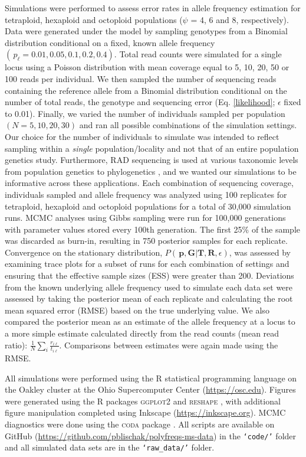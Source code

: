 \documentclass[11pt,english,letterpaper,oneside]{article}
\begin{document}
Simulations were performed to assess error rates in allele frequency estimation for tetraploid, hexaploid and octoploid populations ($\psi$ = 4, 6 and 8, respectively). Data were generated under the model by sampling genotypes from a Binomial distribution conditional on a fixed, known allele frequency $(\,p_{\ell} = 0.01, 0.05, 0.1, 0.2, 0.4)$. Total read counts were simulated for a single locus using a Poisson distribution with mean coverage equal to 5, 10, 20, 50 or 100 reads per individual. We then sampled the number of sequencing reads containing the reference allele from a Binomial distribution conditional on the number of total reads, the genotype and sequencing error (Eq. \ref{likelihood}; $\epsilon$ fixed to 0.01). Finally, we varied the number of individuals sampled per population $(N = 5, 10, 20, 30)$ and ran all possible combinations of the simulation settings. Our choice for the number of individuals to simulate was intended to reflect sampling within a \textit{single} population/locality and not that of an entire population genetics study. Furthermore, RAD sequencing is used at various taxonomic levels from population genetics to phylogenetics \citep[e.g.,][]{rheindt2013zimmerius,eaton2015oaks}, and we wanted our simulations to be informative across these applications. Each combination of sequencing coverage, individuals sampled and allele frequency was analyzed using 100 replicates for tetraploid, hexaploid and octoploid populations for a total of  30,000 simulation runs. MCMC analyses using Gibbs sampling were run for 100,000 generations with parameter values stored every 100th generation. The first 25\% of the sample was discarded as burn-in, resulting in 750 posterior samples for each replicate. Convergence on the stationary distribution, $P(\,\bm{p},\bm{G}|\bm{T},\bm{R},\epsilon)$, was assessed by examining trace plots for a subset of runs for each combination of settings and ensuring that the effective sample sizes (ESS) were greater than 200. Deviations from the known underlying allele frequency used to simulate each data set were assessed by taking the posterior mean of each replicate and calculating the root mean squared error (RMSE) based on the true underlying value. We also compared the posterior mean as an estimate of the allele frequency at a locus to a more simple estimate calculated directly from the read counts (mean read ratio): $\frac{1}{N}\sum_i\frac{r_{i\ell}}{t_{i\ell}}$. Comparisons between estimates were again made using the RMSE.
\medskip

All simulations were performed using the R statistical programming language \citep{r2014} on the Oakley cluster at the Ohio Supercomputer Center (\url{https://osc.edu}). Figures were generated using the R packages \textsc{ggplot2} \citep{wickham2009ggplot2} and \textsc{reshape} \citep{wickham2007reshape}, with additional figure manipulation completed using Inkscape (\url{https://inkscape.org}). MCMC diagnostics were done using the \textsc{coda} package \citep{plummer2006coda}. All scripts are available on GitHub (\url{https://github.com/pblischak/polyfreqs-ms-data}) in the \texttt{`code/'} folder and all simulated data sets are in the \texttt{`raw\_data/'} folder.
\medskip
\end{document}
